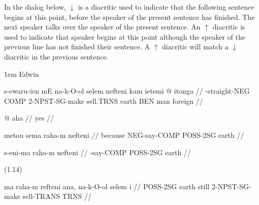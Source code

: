 
\hsize=5in


\def\textsc#1{{\sevenrm \uppercase {#1}}}

In the dialog below, $\downarrow$ is a diacritic used to indicate that the
following sentence begins at this point, before the speaker of the present
sentence has finished.  The next speaker talks over the speaker of the present
sentence. An $\uparrow$ diacritic is used to indicate that speaker begins at
this point although the speaker of the previous line has not finished their
sentence. A $\uparrow$ diacritic will match a $\downarrow$ diacritic in the
previous sentence.

\bigskip

 1em Edwin

\begingl
\gla s-ewaru-ien mE na-k-O-ol selem nefteni kam ietemi \nogloss{$\downarrow$} @ itonga //
\glb \textsc{neg}-straight-\textsc{neg} \textsc{comp} \textsc{2-npst-sg}-make
   sell.\textsc{trns} earth \textsc{ben} man foreign //
\endgl
\endspeaker

\begingl
\gla \nogloss{$\uparrow$} @ aha //
\glb yes //
\endgl
\endspeaker

\begingl
\gla metou sema raha-m nefteni //
\glb because \textsc{neg}-say-\textsc{comp} \textsc{poss-2sg} earth //
\endgl
\endspeaker

\begingl
\gla s-eni-ma raha-m nefteni //
\glb \textsc{neg}-say-\textsc{comp} \textsc{poss-2sg} earth //
\endgl
\endspeaker

\speaker{}
(1.14)
\endspeaker

\speaker{}
\begingl
\gla ma raha-m refteni ana, na-k-O-ol selem i //
\glb \textsc{comp} \textsc{poss-2sg} earth still \textsc{2-npst-sg}-make
sell-\textsc{trans} \textsc{trns} //
\endgl
\endspeaker

\bye
